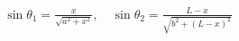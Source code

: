 \documentclass[preview]{standalone}
\begin{document}
\begin{align*}
\sin \theta_1 = \frac{x}{\sqrt{a^2+x^2}}, \quad \sin \theta_2 = \frac{L-x}{\sqrt{b^2+(L-x)^2}}
\end{align*}
\end{document}

